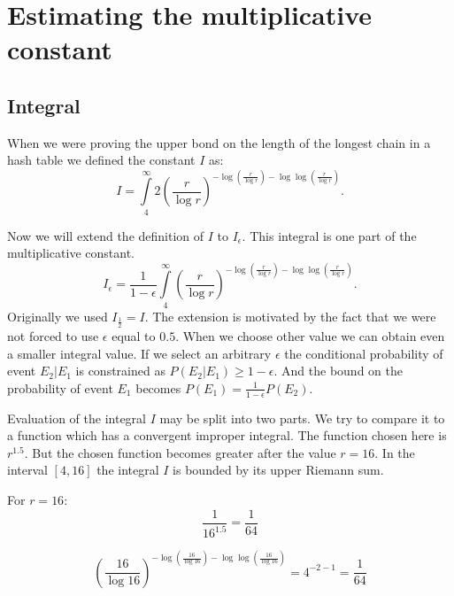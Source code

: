 \section{Estimating the multiplicative constant}

\subsection{Integral}
When we were proving the upper bond on the length of the longest chain in a hash table we defined the constant $I$ as:
\begin{displaymath}
I = \displaystyle\int\limits_4^\infty 2 \left(\frac{r}{\log r}\right)^{-\log \left(\frac{r}{\log r}\right) - \log \log \left(\frac{r}{\log r}\right)}\textit{.}
\end{displaymath}

Now we will extend the definition of $I$ to $I_{\epsilon}$. This integral is one part of the multiplicative constant.
\begin{displaymath}
I_{\epsilon} = \frac{1}{1 - \epsilon} \displaystyle\int\limits_4^\infty \left(\frac{r}{\log r}\right)^{-\log \left(\frac{r}{\log r}\right) - \log \log \left(\frac{r}{\log r}\right)}\textit{.}
\end{displaymath}
Originally we used $I_{\frac{1}{2}} = I$. The extension is motivated by the fact that we were not forced to use $\epsilon$ equal to $0.5$. When we choose other value we can obtain even a smaller integral value. If we select an arbitrary $\epsilon$ the conditional probability of event $E_2 | E_1$ is constrained as $P(E_2 | E_1) \geq 1 - \epsilon$. And the bound on the probability of event $E_1$ becomes $P(E_1) = \frac{1}{1-\epsilon} P(E_2)$.

Evaluation of the integral $I$ may be split into two parts. We try to compare it to a function which has a convergent improper integral. The function chosen here is $r^{1.5}$. But the chosen function becomes greater after the value $r = 16$. In the interval $[4, 16]$ the integral $I$ is bounded by its upper Riemann sum.

For $r = 16$:
\begin{displaymath}
\frac{1}{16 ^ {1.5}} = \frac{1}{64}
\end{displaymath}

\begin{displaymath}
\left(\frac{16}{\log 16}\right)^{-\log \left(\frac{16}{\log 16}\right) - \log \log \left(\frac{16}{\log 16}\right)} = 4^{-2 - 1} = \frac{1}{64}
\end{displaymath}

